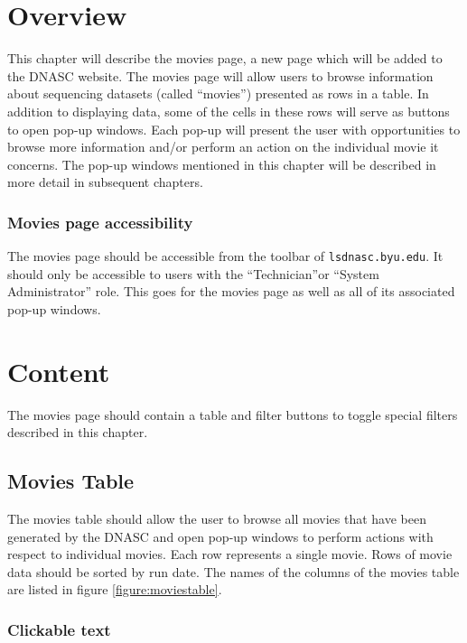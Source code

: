 
\section{Overview}

This chapter will describe the movies page, a new page which will be added to the
DNASC website. The movies page will allow users to browse information about sequencing datasets 
(called ``movies'') presented as rows in a table. In addition to displaying data, some of the 
cells in these rows will serve as buttons to open pop-up windows. Each pop-up will present 
the user with opportunities to browse more information and/or perform an action on the 
individual movie it concerns. The pop-up windows mentioned in this chapter will be described 
in more detail in subsequent chapters. 

\subsubsection{Movies page accessibility}

The movies page should be accessible from the toolbar of \texttt{lsdnasc.byu.edu}. It should
only be accessible to users with the ``Technician''or ``System Administrator'' role. This goes 
for the movies page as well as all of its associated pop-up windows.

\section{Content}

The movies page should contain a table and filter buttons to toggle special filters described 
in this chapter.

\subsection{Movies Table}

The movies table should allow the user to browse all movies that have been generated by the 
DNASC and open pop-up windows to perform actions with respect to individual movies. Each row
represents a single movie. Rows of movie data should be sorted by run date.
The names of the columns of the movies table are listed in figure \ref{figure:moviestable}.

\subsubsection{Clickable text}

